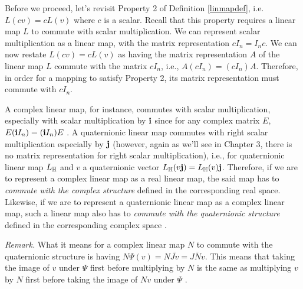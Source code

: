 Before we proceed, let's revisit Property 2 of Definition \ref{linmapdef}, i.e. $L(cv) = cL(v)$ where $c$ is a scalar. Recall that this property requires a linear map $L$ to commute with scalar multiplication. We can represent scalar multiplication as a linear map, with the matrix representation $cI_n = I_n c$. We can now restate $L(cv) = cL(v)$ as having the matrix representation $A$ of the linear map $L$ commute with the matrix $cI_n$, i.e., $A(cI_n) = (cI_n)A$. Therefore, in order for a mapping to satisfy Property 2, its matrix representation must commute with $cI_n$.

A complex linear map, for instance, commutes with scalar multiplication, especially with scalar multiplication by $\textbf{i}$ since for any complex matrix $E$, $E(\textbf{i} I_n) = (\textbf{i} I_n)E$ \cite{aslaksen}. A quaternionic linear map commutes with right scalar multiplication especially by $\textbf{j}$ (however, again as we'll see in Chapter 3, there is no matrix representation for right scalar multiplication), i.e., for quaternionic linear map $L_{\operatorname{\mathbb{H}}}$ and $v$ a quaternionic vector $L_{\operatorname{\mathbb{H}}}(v\textbf{j}) = L_{\operatorname{\mathbb{H}}}(v)\textbf{j}$. Therefore, if we are to represent a complex linear map as a real linear map, the said map has to \emph{commute with the complex structure} defined in the corresponding real space. Likewise, if we are to represent a quaternionic linear map as a complex linear map, such a linear map also has to \emph{commute with the quaternionic structure} defined in the corresponding complex space \cite{aslaksen}. 

\textit{Remark.} What it means for a complex linear map $N$ to commute with the quaternionic structure is having $N\Psi(v) = N\overline{Jv} = \overline{JNv}$. This means that taking the image of $v$ under $\Psi$ first before multiplying by $N$ is the same as multiplying $v$ by $N$ first before taking the image of $Nv$ under $\Psi$ \cite{aslaksen}.

